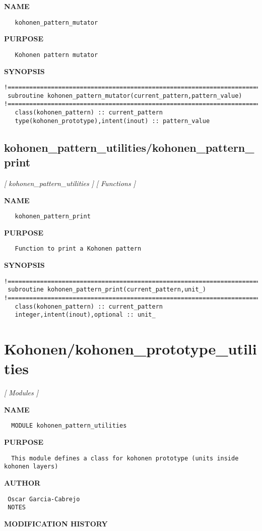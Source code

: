 \documentclass{article}
\begin{document}
\label{ch:robo27}
\label{ch:kohonen_pattern_utilities_kohonen_pattern_mutator}
\textbf{NAME}
\begin{verbatim}
   kohonen_pattern_mutator
\end{verbatim}
\textbf{PURPOSE}
\begin{verbatim}
   Kohonen pattern mutator
\end{verbatim}
\textbf{SYNOPSIS}
\begin{verbatim}
!========================================================================================
 subroutine kohonen_pattern_mutator(current_pattern,pattern_value)
!========================================================================================
   class(kohonen_pattern) :: current_pattern
   type(kohonen_prototype),intent(inout) :: pattern_value
\end{verbatim}
\newpage
\subsection{kohonen\_pattern\_utilities/kohonen\_pattern\_print}
\textsl{[ kohonen\_pattern\_utilities ]}
\textsl{[ Functions ]}

\label{ch:robo28}
\label{ch:kohonen_pattern_utilities_kohonen_pattern_print}
\textbf{NAME}
\begin{verbatim}
   kohonen_pattern_print
\end{verbatim}
\textbf{PURPOSE}
\begin{verbatim}
   Function to print a Kohonen pattern 
\end{verbatim}
\textbf{SYNOPSIS}
\begin{verbatim}
!========================================================================================
 subroutine kohonen_pattern_print(current_pattern,unit_)
!========================================================================================
   class(kohonen_pattern) :: current_pattern
   integer,intent(inout),optional :: unit_
\end{verbatim}
\newpage
\section{Kohonen/kohonen\_prototype\_utilities}
\textsl{[ Modules ]}

\label{ch:robo6}
\label{ch:Kohonen_kohonen_prototype_utilities}
\textbf{NAME}
\begin{verbatim}
  MODULE kohonen_pattern_utilities
\end{verbatim}
\textbf{PURPOSE}
\begin{verbatim}
  This module defines a class for kohonen prototype (units inside kohonen layers) 
\end{verbatim}
\textbf{AUTHOR}
\begin{verbatim}
 Oscar Garcia-Cabrejo
 NOTES 
\end{verbatim}
\textbf{MODIFICATION HISTORY}
\newpage
\end{document}
